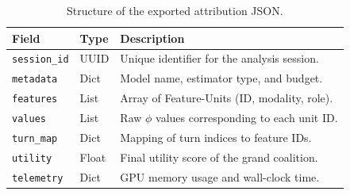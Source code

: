 \documentclass[11pt]{article}
\begin{document}
\begin{table}[ht]
\centering
\small
\caption{Structure of the exported attribution JSON.}
\begin{tabular}{llp{4.5cm}}
\toprule
\textbf{Field} & \textbf{Type} & \textbf{Description} \\
\midrule
\texttt{session\_id} & UUID & Unique identifier for the analysis session. \\
\texttt{metadata}   & Dict & Model name, estimator type, and budget. \\
\texttt{features}   & List & Array of Feature-Units (ID, modality, role). \\
\texttt{values}     & List & Raw $\phi$ values corresponding to each unit ID. \\
\texttt{turn\_map}  & Dict & Mapping of turn indices to feature IDs. \\
\texttt{utility}    & Float & Final utility score of the grand coalition. \\
\texttt{telemetry}  & Dict & GPU memory usage and wall-clock time. \\
\bottomrule
\end{tabular}
\label{tab:json_schema}
\end{table}
\end{document}
